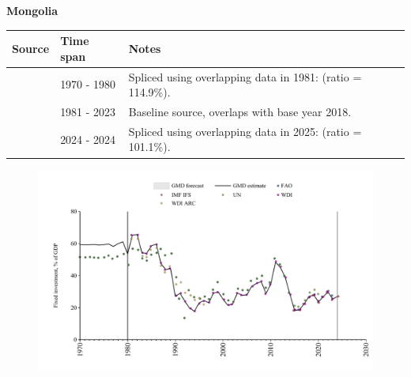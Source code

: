 \documentclass[12pt,a4paper,landscape]{article}
\begin{document}
\begin{adjustbox}{max totalsize={\paperwidth}{\paperheight},center}
\begin{minipage}[t][\textheight][t]{\textwidth}
\vspace*{0.5cm}
{}
\begin{center}
{\Large\bfseries Mongolia}
\end{center}
\vspace{0.5cm}
\begin{table}[H]
\centering
\small
\begin{tabular}{|l|l|l|}
\hline
\textbf{Source} & \textbf{Time span} & \textbf{Notes} \\
\hline
\rowcolor{white}\cite{UN}& 1970 - 1980 &Spliced using overlapping data in 1981: (ratio = 114.9\%).\\
\rowcolor{lightgray}\cite{WDI}& 1981 - 2023 &Baseline source, overlaps with base year 2018.\\
\rowcolor{white}\cite{IMF_IFS}& 2024 - 2024 &Spliced using overlapping data in 2025: (ratio = 101.1\%).\\
\hline
\end{tabular}
\end{table}
\begin{figure}[H]
\centering
\includegraphics[width=\textwidth,height=0.6\textheight,keepaspectratio]{graphs/MNG_finv_GDP.pdf}
\end{figure}
\end{minipage}
\end{adjustbox}
\end{document}
